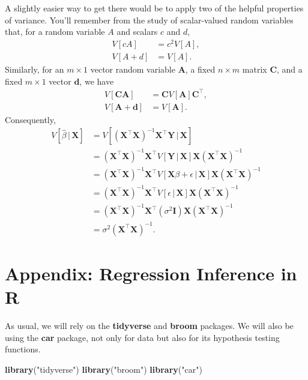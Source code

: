 \documentclass[12pt,oneside,openany]{book}
\newenvironment{Shaded}{\begin{snugshade}}{\end{snugshade}}
\newcommand{\KeywordTok}[1]{\textcolor[rgb]{0.13,0.29,0.53}{\textbf{{#1}}}}
\newcommand{\StringTok}[1]{\textcolor[rgb]{0.31,0.60,0.02}{{#1}}}
\newcommand{\NormalTok}[1]{{#1}}
\begin{document}
A slightly easier way to get there would be to apply two of the helpful
properties of variance. You'll remember from the study of scalar-valued
random variables that, for a random variable \(A\) and scalars \(c\) and
\(d\), \[
\begin{aligned}
  V[c A] &= c^2 V[A], \\
  V[A + d] &= V[A].
\end{aligned}
\] Similarly, for an \(m \times 1\) vector random variable
\(\mathbf{A}\), a fixed \(n \times m\) matrix \(\mathbf{C}\), and a
fixed \(m \times 1\) vector \(\mathbf{d}\), we have \[
\begin{aligned}
  V[\mathbf{C} \mathbf{A}] &= \mathbf{C} V[\mathbf{A}] \mathbf{C}^\top, \\
  V[\mathbf{A} + \mathbf{d}] &= V[\mathbf{A}].
\end{aligned}
\] Consequently, \[
\begin{aligned}
  V \left[ \hat{\beta} \,|\, \mathbf{X} \right]
  &= V[ (\mathbf{X}^\top \mathbf{X})^{-1} \mathbf{X}^\top \mathbf{Y} \,|\, \mathbf{X} ] \\
  &= (\mathbf{X}^\top \mathbf{X})^{-1} \mathbf{X}^\top V [\mathbf{Y} \,|\, \mathbf{X}] \mathbf{X} (\mathbf{X}^\top \mathbf{X})^{-1} \\
  &= (\mathbf{X}^\top \mathbf{X})^{-1} \mathbf{X}^\top V [\mathbf{X} \beta + \epsilon \,|\, \mathbf{X}] \mathbf{X} (\mathbf{X}^\top \mathbf{X})^{-1} \\
  &= (\mathbf{X}^\top \mathbf{X})^{-1} \mathbf{X}^\top V [\epsilon \,|\, \mathbf{X}] \mathbf{X} (\mathbf{X}^\top \mathbf{X})^{-1} \\
  &= (\mathbf{X}^\top \mathbf{X})^{-1} \mathbf{X}^\top (\sigma^2 \mathbf{I}) \mathbf{X} (\mathbf{X}^\top \mathbf{X})^{-1} \\
  &= \sigma^2 (\mathbf{X}^\top \mathbf{X})^{-1}.
\end{aligned}
\]

\section{Appendix: Regression Inference in
R}\label{appendix-regression-inference-in-r}

As usual, we will rely on the \textbf{tidyverse} and \textbf{broom}
packages. We will also be using the \textbf{car} package, not only for
data but also for its hypothesis testing functions.

\begin{Shaded}
\begin{Highlighting}[]
\KeywordTok{library}\NormalTok{(}\StringTok{"tidyverse"}\NormalTok{)}
\KeywordTok{library}\NormalTok{(}\StringTok{"broom"}\NormalTok{)}
\KeywordTok{library}\NormalTok{(}\StringTok{"car"}\NormalTok{)}
\end{Highlighting}
\end{Shaded}
\end{document}
